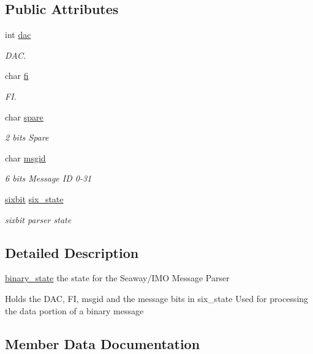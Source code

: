 \subsection*{Public Attributes}
\begin{DoxyCompactItemize}
\item 
int \mbox{\hyperlink{structbinary__state_ae8cf4591ee7170f618edc13bb96d340a}{dac}}
\begin{DoxyCompactList}\small\item\em D\+AC. \end{DoxyCompactList}\item 
char \mbox{\hyperlink{structbinary__state_a204ab2eec6e01aab85747a8014dd0425}{fi}}
\begin{DoxyCompactList}\small\item\em FI. \end{DoxyCompactList}\item 
char \mbox{\hyperlink{structbinary__state_ace2dab0bdacb7a7929db1377b36f20cc}{spare}}
\begin{DoxyCompactList}\small\item\em 2 bits Spare \end{DoxyCompactList}\item 
char \mbox{\hyperlink{structbinary__state_afa92bba159375e76df8924ecf0de2789}{msgid}}
\begin{DoxyCompactList}\small\item\em 6 bits Message ID 0-\/31 \end{DoxyCompactList}\item 
\mbox{\hyperlink{structsixbit}{sixbit}} \mbox{\hyperlink{structbinary__state_a482cffe8a412223abc3a14f791340cd3}{six\+\_\+state}}
\begin{DoxyCompactList}\small\item\em sixbit parser state \end{DoxyCompactList}\end{DoxyCompactItemize}


\subsection{Detailed Description}
\mbox{\hyperlink{structbinary__state}{binary\+\_\+state}} the state for the Seaway/\+I\+MO Message Parser

Holds the D\+AC, FI, msgid and the message bits in six\+\_\+state Used for processing the data portion of a binary message 

\subsection{Member Data Documentation}
\mbox{\label{structbinary__state_ae8cf4591ee7170f618edc13bb96d340a}} 
